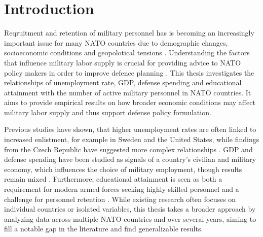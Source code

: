 \chapter{Introduction}

Reqruitment and retention of military personnel has is becoming an increasingly 
important issue for many NATO countries due to demographic changes, socioeconomic 
conditions and geopolotical tensions \parencite{nato_research_and_technology_organization_recruiting_2007,nato_nato_2022}.
Understanding the factors that influence military labor supply is crucial for providing 
advice to NATO policy makers in order to improve defence planning \parencite{nato_research_and_technology_organization_recruiting_2007}.
This thesis investigates the relationships of
unemployment rate, GDP, defense spending and educational attainment with
the number of active military personnel in NATO countries.
It aims to provide empirical results on how broader economic conditions 
may affect military labor supply and thus support defense policy formulation.

Previous studies have shown, that higher unemployment rates are often 
linked to increased enlistment, for example in Sweden and the United States, 
while findings from the Czech Republic have suggested more complex relationships
\parencite{backstrom_are_2019,asch_cash_2010,holcner_military_2021}. 
GDP and defense spending have been studied as signals of a country’s 
civilian and military economy, which influences the choice of military employment, 
though results remain mixed \parencite{warner_chapter_1995,holcner_military_2021}. 
Furthermore, educational attainment is seen as both a requirement for modern armed forces seeking highly skilled personnel 
and a challenge for personnel retention
\parencite{cnas_resources_and_force_readiness_division_fiscal_nodate,hof_quality_2023}. 
While existing research 
often focuses on individual countries or isolated variables, this thesis takes a 
broader approach by analyzing data across multiple NATO countries and over several years, 
aiming to fill a notable gap in the literature and find generalizable results.